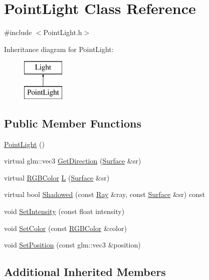\hypertarget{class_point_light}{}\section{Point\+Light Class Reference}
\label{class_point_light}


{\ttfamily \#include $<$Point\+Light.\+h$>$}

Inheritance diagram for Point\+Light\+:\begin{figure}[H]
\begin{center}
\leavevmode
\includegraphics[height=2.000000cm]{class_point_light}
\end{center}
\end{figure}
\subsection*{Public Member Functions}
\begin{DoxyCompactItemize}
\item 
\hyperlink{class_point_light_abbfdf5f05b559c49016f8bb97b0ca414}{Point\+Light} ()
\item 
virtual glm\+::vec3 \hyperlink{class_point_light_af587fd5a2e72f32fcf5041a2cfb055e1}{Get\+Direction} (\hyperlink{class_surface}{Surface} \&sr)
\item 
virtual \hyperlink{class_r_g_b_color}{R\+G\+B\+Color} \hyperlink{class_point_light_a0d5e1227bc28f5a26edb595fe443f7f3}{L} (\hyperlink{class_surface}{Surface} \&sr)
\item 
virtual bool \hyperlink{class_point_light_aa4a50b149cdc22acbf2140a7e2ff9551}{Shadowed} (const \hyperlink{class_ray}{Ray} \&ray, const \hyperlink{class_surface}{Surface} \&sr) const
\item 
void \hyperlink{group___lights_ga1d97c3f6d636899b719d5014f74b3530}{Set\+Intensity} (const float intensity)
\item 
void \hyperlink{group___lights_ga27c17e299711f7131091c714b837f619}{Set\+Color} (const \hyperlink{class_r_g_b_color}{R\+G\+B\+Color} \&color)
\item 
void \hyperlink{group___lights_ga21b458bf745d4fe52a62e503a4fb3d24}{Set\+Position} (const glm\+::vec3 \&position)
\end{DoxyCompactItemize}
\subsection*{Additional Inherited Members}


